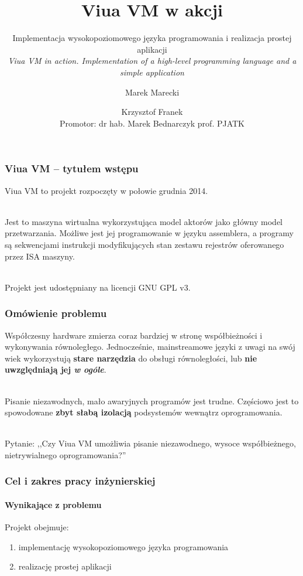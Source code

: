 \documentclass{beamer}
\title{Viua VM w akcji}
\subtitle{Implementacja wysokopoziomowego języka programowania i realizacja prostej aplikacji
\\
\emph{Viua VM in action. Implementation of a high-level programming language and a simple application}}
\author{Marek Marecki \and Krzysztof Franek \\ Promotor: dr hab. Marek Bednarczyk prof. PJATK}
\begin{document}

\frame{\titlepage}

\begin{frame}
    \frametitle{Viua VM -- tytułem wstępu}

    Viua VM to projekt rozpoczęty w połowie grudnia 2014.

    ~\\

    Jest to maszyna wirtualna wykorzystująca model aktorów jako główny model przetwarzania.
    Możliwe jest jej programowanie w języku assemblera, a programy są sekwencjami instrukcji modyfikujących
    stan zestawu rejestrów oferowanego przez ISA maszyny.

    ~\\

    Projekt jest udostępniany na licencji GNU GPL v3.
\end{frame}

\begin{frame}
    \frametitle{Omówienie problemu}

    Współczesny hardware zmierza coraz bardziej w stronę współbieżności i
    wykonywania równoległego. Jednocześnie, mainstreamowe języki z uwagi na swój
    wiek wykorzystują \textbf{stare narzędzia} do obsługi równoległości, lub
    \textbf{nie uwzględniają jej \emph{w ogóle}}.

    ~\\

    Pisanie niezawodnych, mało awaryjnych programów jest trudne. Częściowo jest
    to spowodowane \textbf{zbyt słabą izolacją} podsystemów wewnątrz oprogramowania.

    ~\\

    Pytanie: ,,Czy Viua VM umożliwia pisanie niezawodnego, wysoce współbieżnego,
    nietrywialnego oprogramowania?''
\end{frame}

\begin{frame}
    \frametitle{Cel i zakres pracy inżynierskiej}
    \framesubtitle{Wynikające z problemu}

    Projekt obejmuje:
    \begin{enumerate}
        \item implementację wysokopoziomowego języka programowania
        \item realizację prostej aplikacji
    \end{enumerate}
\end{frame}
\end{document}
